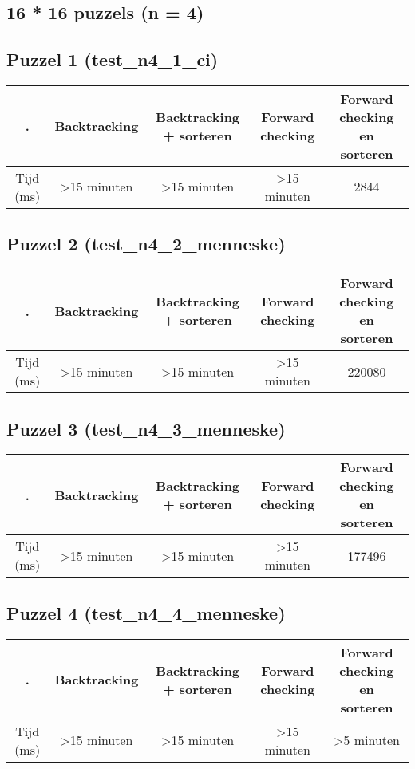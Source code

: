 \documentclass[]{report}
\begin{document}
\begin{appendices}
\section{16 * 16 puzzels (n = 4)}
\subsection{Puzzel 1 (test\_n4\_1\_ci)}
\begin{tabular}{|c||c|c|c|c|}
\hline . & Backtracking & Backtracking + sorteren & Forward checking & Forward checking en sorteren \\ 
\hline \hline Tijd (ms) & \textgreater 15 minuten & \textgreater 15 minuten & \textgreater 15 minuten & 2844 \\ 
\hline 
\end{tabular}
\subsection{Puzzel 2 (test\_n4\_2\_menneske)}
\begin{tabular}{|c||c|c|c|c|}
\hline . & Backtracking & Backtracking + sorteren & Forward checking & Forward checking en sorteren \\ 
\hline \hline Tijd (ms) & \textgreater 15 minuten & \textgreater 15 minuten & \textgreater 15 minuten & 220080 \\ 
\hline 
\end{tabular}
\subsection{Puzzel 3 (test\_n4\_3\_menneske)}
\begin{tabular}{|c||c|c|c|c|}
\hline . & Backtracking & Backtracking + sorteren & Forward checking & Forward checking en sorteren \\ 
\hline \hline Tijd (ms) & \textgreater 15 minuten & \textgreater 15 minuten & \textgreater 15 minuten & 177496 \\ 
\hline 
\end{tabular}
\subsection{Puzzel 4 (test\_n4\_4\_menneske)}
\begin{tabular}{|c||c|c|c|c|}
\hline . & Backtracking & Backtracking + sorteren & Forward checking & Forward checking en sorteren \\ 
\hline \hline Tijd (ms) & \textgreater 15 minuten & \textgreater 15 minuten & \textgreater 15 minuten & \textgreater 5 minuten \\ 
\hline 
\end{tabular}

\end{appendices}
\end{document}
